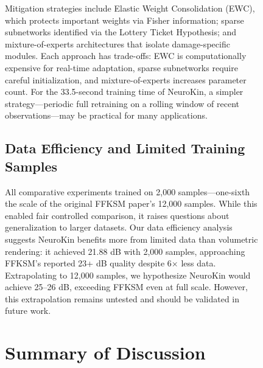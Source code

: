 \documentclass[12pt,a4paper,oneside]{report}
\begin{document}
\begin{figure}[H]
Mitigation strategies include Elastic Weight Consolidation (EWC), which protects important weights via Fisher information; sparse subnetworks identified via the Lottery Ticket Hypothesis; and mixture-of-experts architectures that isolate damage-specific modules. Each approach has trade-offs: EWC is computationally expensive for real-time adaptation, sparse subnetworks require careful initialization, and mixture-of-experts increases parameter count. For the 33.5-second training time of NeuroKin, a simpler strategy---periodic full retraining on a rolling window of recent observations---may be practical for many applications.

\subsection{Data Efficiency and Limited Training Samples}

All comparative experiments trained on 2,000 samples---one-sixth the scale of the original FFKSM paper's 12,000 samples. While this enabled fair controlled comparison, it raises questions about generalization to larger datasets. Our data efficiency analysis suggests NeuroKin benefits more from limited data than volumetric rendering: it achieved 21.88 dB with 2,000 samples, approaching FFKSM's reported 23+ dB quality despite 6$\times$ less data. Extrapolating to 12,000 samples, we hypothesize NeuroKin would achieve 25--26 dB, exceeding FFKSM even at full scale. However, this extrapolation remains untested and should be validated in future work.

\section{Summary of Discussion}


\end{figure}
\end{document}
